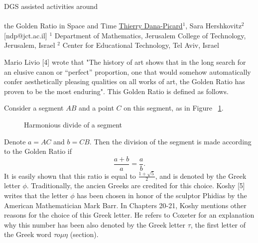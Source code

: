 


\begin{abstract_online}{DGS assisted activities around \\ \quad \\ the Golden Ratio in Space and Time}{%
        \underline{Thierry Dana-Picard}$^{1}$, Sara Hershkovitz$^{2}$}{[ndp@jct.ac.il]
        }{%
        $^1$ Department of Mathematics, Jerusalem College of Technology, Jerusalem, Israel \newline{}$^2$ Center for Educational Technology, Tel Aviv, Israel \newline{}}

Mario Livio [4] wrote that "The history of art shows that in the long search for an elusive canon or “perfect” proportion, one that would somehow automatically confer aesthetically pleasing qualities on all works of art, the Golden Ratio has proven to be the most enduring". This Golden Ratio is defined as follows.

Consider a segment $AB$ and a point $C$ on this segment, as in Figure ~\ref{golden ratio def}.

\begin{figure}[h]
\centering
\mbox{}
\caption{Harmonious divide of a segment}
\label{golden ratio def}
\end{figure}
Denote $a=AC$ and $b=CB$. Then the division of the segment is made according to the Golden Ratio if
\begin{equation*}
\frac{a+b}{a}=\frac{a}{b}.
\end{equation*}
It is easily shown that this ratio is equal to  $\frac{1+\sqrt{5}}{2}$, and is denoted by the Greek letter $\phi$.
Traditionally, the ancien Greeks are credited for this choice. Koshy [5] writes that the letter $\phi$ has been chosen in honor of the sculptor Phidias by the American Mathematician Mark Barr. In Chapters 20-21, Koshy mentions other reasons for the choice of this Greek letter. He refers to Coxeter for an explanation why this number has been also denoted by the Greek letter $\tau$, the first letter of the Greek word $\tau o \mu \eta$ (section).


\end{abstract_online}
